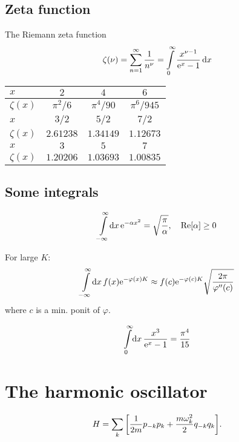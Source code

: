\documentclass[11pt,letter, swedish, english, twocolumn
]{article}
\begin{document}
\subsection{Zeta function}
The Riemann zeta function
\begin{equation}
\zeta(\nu)=\sum_{n=1}^\infty \frac{1}{n^\nu}
=\int_0^\infty \frac{x^{\nu-1}}{\ee^x -1}\id{x}
\end{equation}

\begin{center}
\begin{tabular}{|l||c|c|c|}\hline
$x$ & $2$ & $4$ & $6$
\\ \hline $\zeta(x)$ & 
$\pi^2/6$ & $\pi^4/90$ & $\pi^6/945$ 
\\ \hline\hline
$x$ & $3/2$ & $5/2$ & $7/2$
\\ \hline $\zeta(x)$ & 
$2.61238$ & $1.34149$ & $1.12673$ 
\\ \hline\hline
$x$ & $3$ & $5$ & $7$
\\ \hline$\zeta(x)$ & 
$1.20206$ & $1.03693$ & $1.00835$ 
\\ \hline
\end{tabular}
\end{center}

\subsection{Some integrals}
\begin{equation}
\int_{-\infty}^\infty\!\rd{x}\,\ee^{-\alpha x^2}
=\sqrt{\frac{\pi}{\alpha}}
\qcomma \Re[\alpha]\ge0
\end{equation}

For large $K$:
\begin{equation}
\int_{-\infty}^\infty\!\rd{x}\,
f(x)\ee^{-\varphi(x)K}
\approx
f(c)\ee^{-\varphi(c)K}\sqrt{\frac{2\pi}{\varphi''(c)}}
\end{equation}
where $c$ is a min. ponit of $\varphi$.

\begin{equation}
\int_0^\infty\!\rd{x}\,
\frac{x^3}{\ee^x-1}=\frac{\pi^4}{15}
\end{equation}


\section{The harmonic oscillator}
\begin{equation}
H=\sum_{k}\qty[\frac{1}{2m}p_{-k}p_{k}+\frac{m\omega_k^2}{2}q_{-k}q_{k}].
\end{equation}
\end{document}
